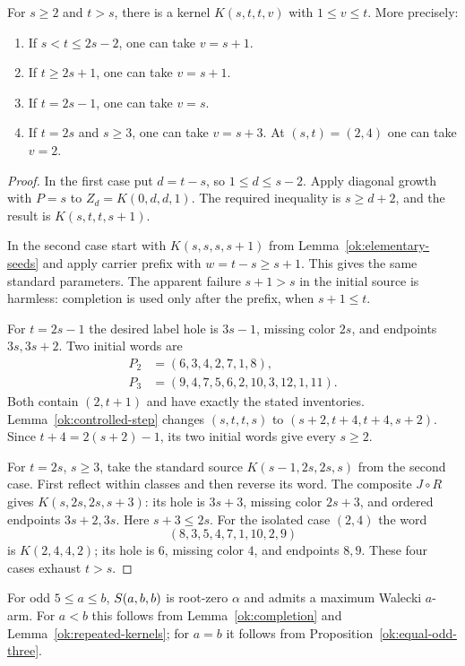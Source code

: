 \begin{lemma}\label{ok:repeated-kernels}
For $s\ge2$ and $t>s$, there is a kernel $K(s,t,t,v)$ with
$1\le v\le t$. More precisely:
\begin{enumerate}
\item If $s<t\le2s-2$, one can take $v=s+1$.
\item If $t\ge2s+1$, one can take $v=s+1$.
\item If $t=2s-1$, one can take $v=s$.
\item If $t=2s$ and $s\ge3$, one can take $v=s+3$.
At $(s,t)=(2,4)$ one can take $v=2$.
\end{enumerate}
\end{lemma}
\begin{proof}
In the first case put $d=t-s$, so $1\le d\le s-2$.
Apply diagonal growth with $P=s$ to $Z_d=K(0,d,d,1)$.
The required inequality is $s\ge d+2$, and the result is
$K(s,t,t,s+1)$.

In the second case start with $K(s,s,s,s+1)$ from
Lemma~\ref{ok:elementary-seeds} and apply carrier prefix with
$w=t-s\ge s+1$. This gives the same standard parameters.
The apparent failure $s+1>s$ in the initial source is harmless:
completion is used only after the prefix, when $s+1\le t$.

For $t=2s-1$ the desired label hole is $3s-1$, missing color
$2s$, and endpoints $3s,3s+2$. Two initial words are
\begin{align*}
 P_2&=(6,3,4,2,7,1,8),\\
 P_3&=(9,4,7,5,6,2,10,3,12,1,11).
\end{align*}
Both contain $(2,t+1)$ and have exactly the stated inventories.
Lemma~\ref{ok:controlled-step} changes $(s,t,t,s)$ to
$(s+2,t+4,t+4,s+2)$. Since $t+4=2(s+2)-1$, its two initial
words give every $s\ge2$.

For $t=2s$, $s\ge3$, take the standard source
$K(s-1,2s,2s,s)$ from the second case. First reflect within
classes and then reverse its word. The composite $J\circ R$ gives
$K(s,2s,2s,s+3)$: its hole is $3s+3$, missing color $2s+3$,
and ordered endpoints $3s+2,3s$. Here $s+3\le2s$.
For the isolated case $(2,4)$ the word
\[
 (8,3,5,4,7,1,10,2,9)
 \]
is $K(2,4,4,2)$; its hole is $6$, missing color $4$, and
endpoints $8,9$. These four cases exhaust $t>s$.
\end{proof}

\begin{corollary}\label{ok:repeated-alpha}
For odd $5\le a\le b$, $S\!\left(a,b,b\right)$ is root-zero $\alpha$ and
admits a maximum Walecki $a$-arm. For $a<b$ this follows from
Lemma~\ref{ok:completion} and Lemma~\ref{ok:repeated-kernels};
for $a=b$ it follows from Proposition~\ref{ok:equal-odd-three}.
\end{corollary}

